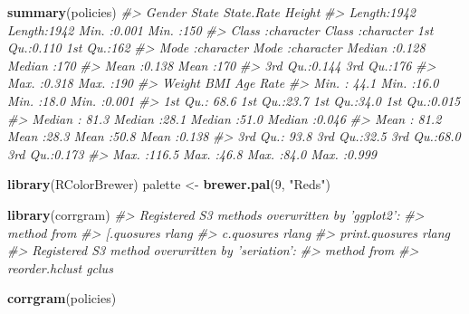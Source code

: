 \documentclass[]{book}
\newenvironment{Shaded}{\begin{snugshade}}{\end{snugshade}}
\newcommand{\CommentTok}[1]{\textcolor[rgb]{0.56,0.35,0.01}{\textit{#1}}}
\newcommand{\DecValTok}[1]{\textcolor[rgb]{0.00,0.00,0.81}{#1}}
\newcommand{\KeywordTok}[1]{\textcolor[rgb]{0.13,0.29,0.53}{\textbf{#1}}}
\newcommand{\NormalTok}[1]{#1}
\newcommand{\StringTok}[1]{\textcolor[rgb]{0.31,0.60,0.02}{#1}}
\begin{document}
\begin{Shaded}
\begin{Highlighting}[]
\KeywordTok{summary}\NormalTok{(policies)}
\CommentTok{#>     Gender             State             State.Rate        Height   }
\CommentTok{#>  Length:1942        Length:1942        Min.   :0.001   Min.   :150  }
\CommentTok{#>  Class :character   Class :character   1st Qu.:0.110   1st Qu.:162  }
\CommentTok{#>  Mode  :character   Mode  :character   Median :0.128   Median :170  }
\CommentTok{#>                                        Mean   :0.138   Mean   :170  }
\CommentTok{#>                                        3rd Qu.:0.144   3rd Qu.:176  }
\CommentTok{#>                                        Max.   :0.318   Max.   :190  }
\CommentTok{#>      Weight           BMI            Age            Rate      }
\CommentTok{#>  Min.   : 44.1   Min.   :16.0   Min.   :18.0   Min.   :0.001  }
\CommentTok{#>  1st Qu.: 68.6   1st Qu.:23.7   1st Qu.:34.0   1st Qu.:0.015  }
\CommentTok{#>  Median : 81.3   Median :28.1   Median :51.0   Median :0.046  }
\CommentTok{#>  Mean   : 81.2   Mean   :28.3   Mean   :50.8   Mean   :0.138  }
\CommentTok{#>  3rd Qu.: 93.8   3rd Qu.:32.5   3rd Qu.:68.0   3rd Qu.:0.173  }
\CommentTok{#>  Max.   :116.5   Max.   :46.8   Max.   :84.0   Max.   :0.999}
\end{Highlighting}
\end{Shaded}

\begin{Shaded}
\begin{Highlighting}[]
\KeywordTok{library}\NormalTok{(RColorBrewer)}
\NormalTok{palette <-}\StringTok{ }\KeywordTok{brewer.pal}\NormalTok{(}\DecValTok{9}\NormalTok{, }\StringTok{"Reds"}\NormalTok{)}
\end{Highlighting}
\end{Shaded}

\begin{Shaded}
\end{Shaded}

\begin{Shaded}
\begin{Highlighting}[]
\KeywordTok{library}\NormalTok{(corrgram)}
\CommentTok{#> Registered S3 methods overwritten by 'ggplot2':}
\CommentTok{#>   method         from }
\CommentTok{#>   [.quosures     rlang}
\CommentTok{#>   c.quosures     rlang}
\CommentTok{#>   print.quosures rlang}
\CommentTok{#> Registered S3 method overwritten by 'seriation':}
\CommentTok{#>   method         from }
\CommentTok{#>   reorder.hclust gclus}

\KeywordTok{corrgram}\NormalTok{(policies)}
\end{Highlighting}
\end{Shaded}
\end{document}
